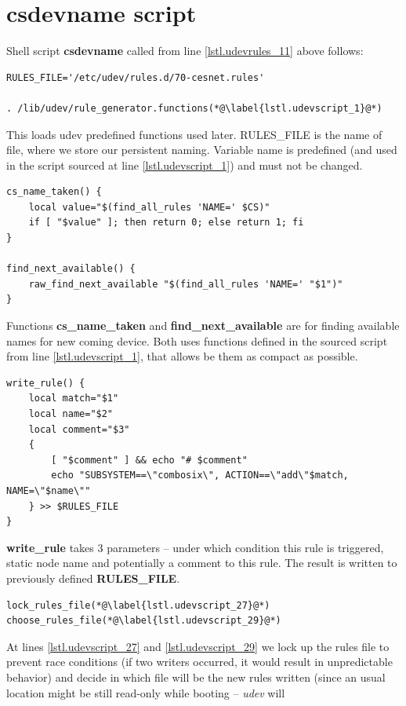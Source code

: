   \section{csdevname script}
  Shell script \textbf{csdevname} called from line \ref{lstl.udevrules_11}
  above follows:
\lstset{language=bash} %
\begin{lstlisting}[label=lst.udevscript,name=lst.udevscript]
RULES_FILE='/etc/udev/rules.d/70-cesnet.rules'

. /lib/udev/rule_generator.functions(*@\label{lstl.udevscript_1}@*)
\end{lstlisting}
  This loads udev predefined functions used later. RULES\_FILE is the
  name of file, where we store our persistent naming. Variable name is
  predefined (and used in the script sourced at line \ref{lstl.udevscript_1})
  and must not be changed.
\begin{lstlisting}[name=lst.udevscript]
cs_name_taken() {
	local value="$(find_all_rules 'NAME=' $CS)"
	if [ "$value" ]; then return 0; else return 1; fi
}

find_next_available() {
	raw_find_next_available "$(find_all_rules 'NAME=' "$1")"
}
\end{lstlisting}
  Functions \textbf{cs\_name\_taken} and \textbf{find\_next\_available} are
  for finding available names for new coming device. Both uses functions
  defined in the sourced script from line \ref{lstl.udevscript_1}, that allows
  be them as compact as possible.
\begin{lstlisting}[name=lst.udevscript]
write_rule() {
	local match="$1"
	local name="$2"
	local comment="$3"
	{
		[ "$comment" ] && echo "# $comment"
		echo "SUBSYSTEM==\"combosix\", ACTION==\"add\"$match, NAME=\"$name\""
	} >> $RULES_FILE
}
\end{lstlisting}
  \textbf{write\_rule} takes 3 parameters -- under which condition this rule
  is triggered, static node name and potentially a comment to this rule. The
  result is written to previously defined \textbf{RULES\_FILE}.
\begin{lstlisting}[name=lst.udevscript]
lock_rules_file(*@\label{lstl.udevscript_27}@*)
choose_rules_file(*@\label{lstl.udevscript_29}@*)
\end{lstlisting}
  At lines \ref{lstl.udevscript_27} and \ref{lstl.udevscript_29} we lock up
  the rules file to prevent race
  conditions (if two writers occurred, it would result in unpredictable
  behavior) and decide in which file will be the new rules written (since
  an usual location might be still read-only while booting -- \emph{udev} will
